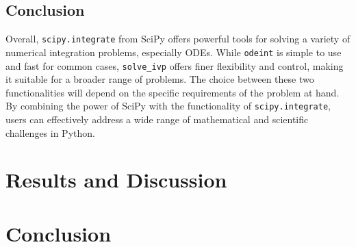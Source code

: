 \documentclass{article}
\begin{document}
\subsection{Conclusion}
Overall, \texttt{scipy.integrate} from SciPy offers powerful tools for solving a variety of numerical integration problems, especially ODEs. While \texttt{odeint} is simple to use and fast for common cases, \texttt{solve\_ivp} offers finer flexibility and control, making it suitable for a broader range of problems. The choice between these two functionalities will depend on the specific requirements of the problem at hand. By combining the power of SciPy with the functionality of \texttt{scipy.integrate}, users can effectively address a wide range of mathematical and scientific challenges in Python.

\section{Results and Discussion}


\section{Conclusion}



\end{document}
